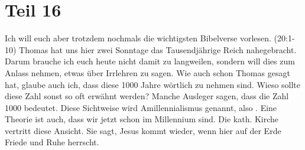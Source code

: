 \section{Teil 16}
\begin{otsblock}
        Ich will euch aber trotzdem nochmals die wichtigsten Bibelverse vorlesen.
        (20:1-10) 
        Thomas hat uns hier zwei Sonntage das Tausendjährige Reich nahegebracht. Darum brauche ich euch heute nicht damit zu langweilen, sondern will dies zum Anlass nehmen, etwas über Irrlehren zu sagen. Wie auch schon Thomas gesagt hat, glaube auch ich, dass diese 1000 Jahre wörtlich zu nehmen sind. Wieso sollte diese Zahl sonst so oft erwähnt werden? Manche Ausleger sagen, dass die Zahl 1000  bedeutet. Diese Sichtweise wird Amillennialismus genannt, also . Eine Theorie ist auch, dass wir jetzt schon im Millennium sind. Die kath. Kirche vertritt diese Ansicht. Sie sagt, Jesus kommt wieder, wenn hier auf der Erde Friede und Ruhe herrscht.


\end{otsblock}
